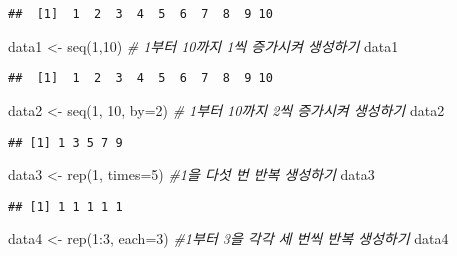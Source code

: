 \documentclass[
]{article}
\newenvironment{Shaded}{\begin{snugshade}}{\end{snugshade}}
\newcommand{\AttributeTok}[1]{\textcolor[rgb]{0.77,0.63,0.00}{#1}}
\newcommand{\CommentTok}[1]{\textcolor[rgb]{0.56,0.35,0.01}{\textit{#1}}}
\newcommand{\DecValTok}[1]{\textcolor[rgb]{0.00,0.00,0.81}{#1}}
\newcommand{\FunctionTok}[1]{\textcolor[rgb]{0.00,0.00,0.00}{#1}}
\newcommand{\NormalTok}[1]{#1}
\newcommand{\OtherTok}[1]{\textcolor[rgb]{0.56,0.35,0.01}{#1}}
\newcommand{\SpecialCharTok}[1]{\textcolor[rgb]{0.00,0.00,0.00}{#1}}
\begin{document}
\begin{verbatim}
##  [1]  1  2  3  4  5  6  7  8  9 10
\end{verbatim}

\begin{Shaded}
\begin{Highlighting}[]
\NormalTok{data1 }\OtherTok{\textless{}{-}} \FunctionTok{seq}\NormalTok{(}\DecValTok{1}\NormalTok{,}\DecValTok{10}\NormalTok{) }\CommentTok{\# 1부터 10까지 1씩 증가시켜 생성하기}
\NormalTok{data1}
\end{Highlighting}
\end{Shaded}

\begin{verbatim}
##  [1]  1  2  3  4  5  6  7  8  9 10
\end{verbatim}

\begin{Shaded}
\begin{Highlighting}[]
\NormalTok{data2 }\OtherTok{\textless{}{-}} \FunctionTok{seq}\NormalTok{(}\DecValTok{1}\NormalTok{, }\DecValTok{10}\NormalTok{, }\AttributeTok{by=}\DecValTok{2}\NormalTok{) }\CommentTok{\# 1부터 10까지 2씩 증가시켜 생성하기}
\NormalTok{data2}
\end{Highlighting}
\end{Shaded}

\begin{verbatim}
## [1] 1 3 5 7 9
\end{verbatim}

\begin{Shaded}
\begin{Highlighting}[]
\NormalTok{data3 }\OtherTok{\textless{}{-}} \FunctionTok{rep}\NormalTok{(}\DecValTok{1}\NormalTok{, }\AttributeTok{times=}\DecValTok{5}\NormalTok{)  }\CommentTok{\#1을 다섯 번 반복 생성하기}
\NormalTok{data3}
\end{Highlighting}
\end{Shaded}

\begin{verbatim}
## [1] 1 1 1 1 1
\end{verbatim}

\begin{Shaded}
\begin{Highlighting}[]
\NormalTok{data4 }\OtherTok{\textless{}{-}} \FunctionTok{rep}\NormalTok{(}\DecValTok{1}\SpecialCharTok{:}\DecValTok{3}\NormalTok{, }\AttributeTok{each=}\DecValTok{3}\NormalTok{)  }\CommentTok{\#1부터 3을 각각 세 번씩 반복 생성하기}
\NormalTok{data4}
\end{Highlighting}
\end{Shaded}
\end{document}
